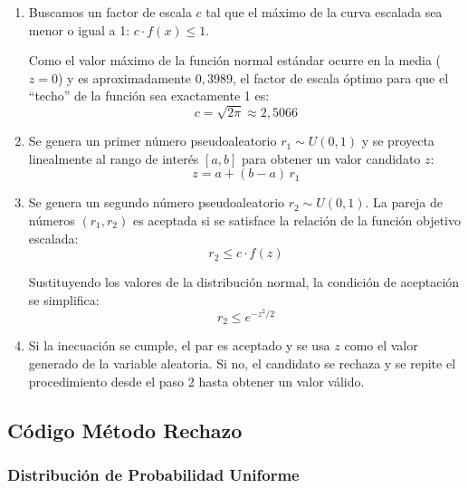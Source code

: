 \documentclass{article}
\begin{document}
\begin{enumerate}
    \item Buscamos un factor de escala $c$ tal que el máximo de la curva escalada sea
          menor o igual a 1: $c \cdot f(x) \leq 1$.

          Como el valor máximo de la función normal estándar ocurre en la media ($z = 0$)
          y es aproximadamente $0{,}3989$, el factor de escala óptimo para que el ``techo''
          de la función sea exactamente 1 es:
          \begin{equation}
              c = \sqrt{2\pi} \approx 2{,}5066
          \end{equation}

    \item Se genera un primer número pseudoaleatorio $r_1 \sim U(0,1)$ y se proyecta
          linealmente al rango de interés $[a, b]$ para obtener un valor candidato $z$:
          \begin{equation}
              z = a + (b - a)\,r_1
          \end{equation}

    \item Se genera un segundo número pseudoaleatorio $r_2 \sim U(0,1)$. La pareja de
          números $(r_1, r_2)$ es aceptada si se satisface la relación de la función objetivo
          escalada:
          \begin{equation}
              r_2 \leq c \cdot f(z)
          \end{equation}

          Sustituyendo los valores de la distribución normal, la condición de aceptación se
          simplifica:
          \begin{equation}
              r_2 \leq e^{-z^2/2}
          \end{equation}

    \item Si la inecuación se cumple, el par es aceptado y se usa $z$ como el valor generado
          de la variable aleatoria. Si no, el candidato se rechaza y se repite el procedimiento
          desde el paso 2 hasta obtener un valor válido.
\end{enumerate}


\subsection{Código Método Rechazo}

\subsubsection{Distribución de Probabilidad Uniforme}
\end{document}
